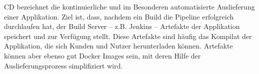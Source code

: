 			\ac{CD} bezeichnet die kontinuierliche und im Besonderen automatisierte Auslieferung einer Applikation. Ziel ist, dass, nachdem ein Build die Pipeline erfolgreich durchlaufen hat, der Build Server -- z.B. Jenkins -- Artefakte der Applikation speichert und zur Verfügung stellt. Diese Artefakte sind häufig das Kompilat der Applikation, die sich Kunden und Nutzer herunterladen können. Artefakte können aber ebenso gut Docker Images sein, mit deren Hilfe der Auslieferungsprozess simplifiziert wird. \cite{Humble.2011}
		                                                                                                                                                                                                                                                                                                                                         
	